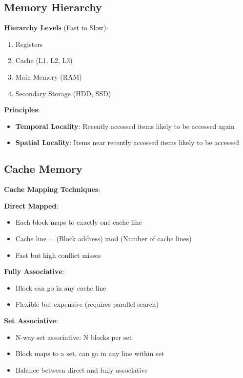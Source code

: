 \documentclass[12pt,a4paper]{report}
\begin{document}
\subsection{Memory Hierarchy}
\begin{concept}
\textbf{Hierarchy Levels} (Fast to Slow):
\begin{enumerate}
    \item Registers
    \item Cache (L1, L2, L3)
    \item Main Memory (RAM)
    \item Secondary Storage (HDD, SSD)
\end{enumerate}

\textbf{Principles}:
\begin{itemize}
    \item \textbf{Temporal Locality}: Recently accessed items likely to be accessed again
    \item \textbf{Spatial Locality}: Items near recently accessed items likely to be accessed
\end{itemize}
\end{concept}

\subsection{Cache Memory}
\begin{concept}
\textbf{Cache Mapping Techniques}:

\textbf{Direct Mapped}:
\begin{itemize}
    \item Each block maps to exactly one cache line
    \item Cache line = (Block address) mod (Number of cache lines)
    \item Fast but high conflict misses
\end{itemize}

\textbf{Fully Associative}:
\begin{itemize}
    \item Block can go in any cache line
    \item Flexible but expensive (requires parallel search)
\end{itemize}

\textbf{Set Associative}:
\begin{itemize}
    \item N-way set associative: N blocks per set
    \item Block maps to a set, can go in any line within set
    \item Balance between direct and fully associative
\end{itemize}
\end{concept}
\end{document}
